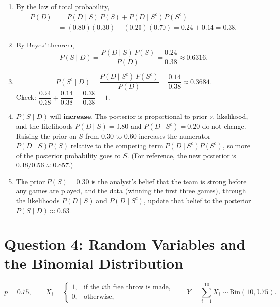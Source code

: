 \documentclass[11pt]{article}
\begin{document}
\begin{enumerate}
\item By the law of total probability,
\[
\begin{aligned}
P(D) &= P(D \mid S)\,P(S) + P(D \mid S^c)\,P(S^c) \\
&= (0.80)(0.30) + (0.20)(0.70) = 0.24 + 0.14 = 0.38.
\end{aligned}
\]

\item By Bayes' theorem,
\[
P(S \mid D) = \frac{P(D \mid S)\,P(S)}{P(D)} = \frac{0.24}{0.38} \approx 0.6316.
\]

\item
\[
P(S^c \mid D) = \frac{P(D \mid S^c)\,P(S^c)}{P(D)} = \frac{0.14}{0.38} \approx 0.3684.
\]
Check: $\dfrac{0.24}{0.38} + \dfrac{0.14}{0.38} = \dfrac{0.38}{0.38} = 1$. \checkmark

\item $P(S \mid D)$ will \textbf{increase}. The posterior is proportional to prior $\times$ likelihood, and the likelihoods $P(D \mid S) = 0.80$ and $P(D \mid S^c) = 0.20$ do not change. Raising the prior on $S$ from $0.30$ to $0.60$ increases the numerator $P(D \mid S)P(S)$ relative to the competing term $P(D \mid S^c)P(S^c)$, so more of the posterior probability goes to $S$. (For reference, the new posterior is $0.48/0.56 \approx 0.857$.)

\item The prior $P(S) = 0.30$ is the analyst's belief that the team is strong before any games are played, and the data (winning the first three games), through the likelihoods $P(D \mid S)$ and $P(D \mid S^c)$, update that belief to the posterior $P(S \mid D) \approx 0.63$.
\end{enumerate}

\section*{Question 4: Random Variables and the Binomial Distribution}

\[
p = 0.75, \qquad
X_i = \begin{cases} 1, & \text{if the $i$th free throw is made,} \\ 0, & \text{otherwise,} \end{cases}
\qquad
Y = \sum_{i=1}^{10} X_i \sim \text{Bin}(10, 0.75).
\]
\end{document}
